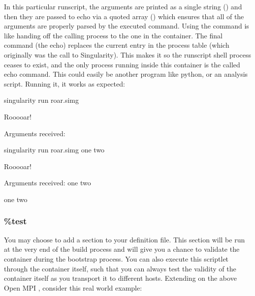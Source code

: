 \documentclass[letterpaper,10pt,english]{sphinxmanual}
\begin{document}
In this particular runscript, the arguments are printed as a single
string (\sphinxcode{\sphinxupquote{\$*}}) and then they are passed to echo via a quoted array () which
ensures that all of the arguments are properly parsed by the executed
command. Using the  command is like handing off the calling process to
the one in the container. The final command (the echo) replaces the
current entry in the process table (which originally was the call to
Singularity). This makes it so the runscript shell process ceases to
exist, and the only process running inside this container is the called
echo command. This could easily be another program like python, or an
analysis script. Running it, it works as expected:

%
\begin{sphinxVerbatim}[commandchars=\\\{\}]
\PYGZdl{} singularity run roar.simg

Rooooar!

Arguments received:


\PYGZdl{} singularity run roar.simg one two

Rooooar!

Arguments received: one two

one two
\end{sphinxVerbatim}


\subsubsection{\%test}
\label{\detokenize{container_recipes:test}}
You may choose to add a  section to your definition file. This section
will be run at the very end of the build process and will give you a
chance to validate the container during the bootstrap process. You can
also execute this scriptlet through the container itself, such that you
can always test the validity of the container itself as you transport it
to different hosts. Extending on the above Open MPI , consider this real
world example:

%
\begin{sphinxVerbatim}[commandchars=\\\{\}]

      
\end{sphinxVerbatim}
\end{document}
